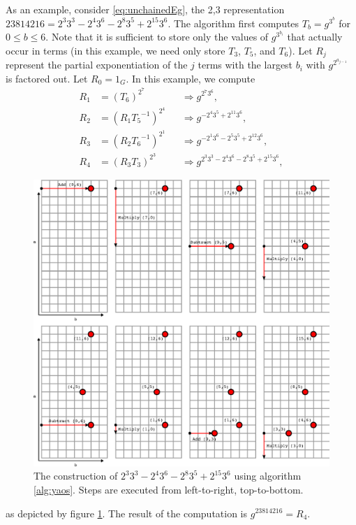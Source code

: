 \documentclass{ucalgthes1}
\theoremstyle{plain}
\theoremstyle{definition}
\begin{document}
As an example, consider \eqref{eq:unchainedEg}, the 2,3 representation $23814216 = 2^3 3^3 - 2^4 3^6 - 2^8 3^5 + 2^{15} 3^6$.  The algorithm first computes $T_b = g^{3^b}$ for $0 \le b \le 6$.  Note that it is sufficient to store only the values of $g^{3^{b_i}}$ that actually occur in terms (in this example, we need only store $T_3$, $T_5$, and $T_6$).  Let $R_j$ represent the partial exponentiation of the $j$ terms with the largest $b_i$ with $g^{2^{a_{j-1}}}$ is factored out.  Let $R_0 = 1_G$.  In this example, we compute 
\begin{align*}
	R_1 &= \left( T_6 \right)^{2^7} &&\Rightarrow g^{2^7 3^6}, \\
	R_2 &= \left( R_1 {T_5}^{-1} \right)^{2^4} &&\Rightarrow g^{-2^4 3^5 + 2^{11} 3^6}, \\
	R_3 &= \left( R_2 {T_6}^{-1} \right)^{2^1} &&\Rightarrow g^{-2^1 3^6 -2^5 3^5 + 2^{12} 3^6}, \\
	R_4 &= \left( R_3 T_3 \right) ^ {2^3} &&\Rightarrow g^{2^3 3^3 -2^4 3^6 -2^8 3^5 + 2^{15} 3^6},
\end{align*}
\begin{figure}[H]
\centering
\includegraphics{yao1}
\caption{The construction of $2^3 3^3 - 2^4 3^6 - 2^8 3^5 + 2^{15} 3^6$ using algorithm \ref{alg:yaos}.  Steps are executed from left-to-right, top-to-bottom.}
\label{fig:yao1}
\end{figure}
as depicted by figure \ref{fig:yao1}.  The result of the computation is $g^{23814216} = R_4$.  
\end{document}
